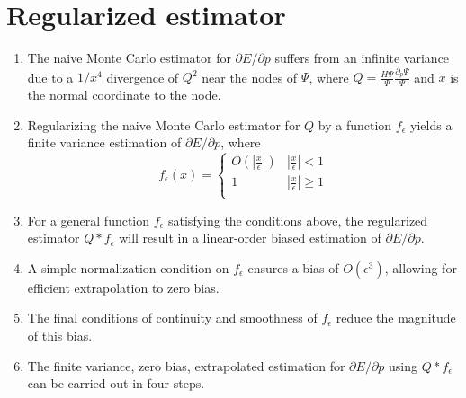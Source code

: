 \documentclass{article}
\begin{document}
\section{Regularized estimator}
\begin{enumerate}
\item The naive Monte Carlo estimator for $\partial E/\partial p$ suffers from an infinite variance due to a $1/x^4$ divergence of $Q^2$ near the nodes of $\Psi$, where $Q = \frac{H\Psi}{\Psi}\frac{\partial_p \Psi}{\Psi}$ and $x$ is the normal coordinate to the node.

\item Regularizing the naive Monte Carlo estimator for $Q$ by a function $f_\epsilon$ yields a finite variance estimation of $\partial E/\partial p$, where 
\[ f_\epsilon(x) = \begin{cases} 
      O(|\frac{x}{\epsilon}|) & |\frac{x}{\epsilon}| < 1 \\
      1 & |\frac{x}{\epsilon}| \ge 1 \\
   \end{cases}
\]

\item For a general function $f_\epsilon$ satisfying the conditions above, the regularized estimator $Q * f_\epsilon$ will result in a linear-order biased estimation of $\partial E/\partial p$.

\item A simple normalization condition on $f_\epsilon$ ensures a bias of $O(\epsilon^3)$, allowing for efficient extrapolation to zero bias.

\item The final conditions of continuity and smoothness of $f_\epsilon$ reduce the magnitude of this bias.

\item The finite variance, zero bias, extrapolated estimation for $\partial E/\partial p$ using $Q * f_\epsilon$ can be carried out in four steps.

\end{enumerate}
\end{document}
